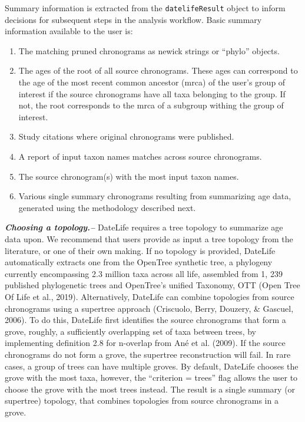 \documentclass[english,man]{apa6}
\providecommand{\tightlist}{%
  \setlength{\itemsep}{0pt}\setlength{\parskip}{0pt}}
\begin{document}
Summary information is extracted from the \texttt{datelifeResult} object to inform decisions for subsequent steps in the analysis workflow. Basic summary information available to the user is:

\begin{enumerate}
\def\labelenumi{\arabic{enumi}.}
\tightlist
\item
  The matching pruned chronograms as newick strings or \enquote{phylo} objects.
\item
  The ages of the root of all source chronograms. These ages can correspond to the age of the most recent common ancestor (mrca) of the user's group of interest if the source chronograms have all taxa belonging to the group. If not, the root corresponds to the mrca of a subgroup withing the group of interest.
\item
  Study citations where original chronograms were published.
\item
  A report of input taxon names matches across source chronograms.
\item
  The source chronogram(s) with the most input taxon names.
\item
  Various single summary chronograms resulting from summarizing age data, generated using the methodology described next.
\end{enumerate}

\emph{\textbf{Choosing a topology.--}}
DateLife requires a tree topology to summarize age data upon.
We recommend that users provide as input a tree topology from the literature, or one of their own making. If no topology is provided, DateLife automatically extracts one from the OpenTree synthetic tree, a phylogeny currently encompassing 2.3 million taxa across all life, assembled from 1, 239 published phylogenetic trees and OpenTree's unified Taxonomy, OTT (Open Tree Of Life et al., 2019).
Alternatively, DateLife can combine topologies from source chronograms using a supertree approach (Criscuolo, Berry, Douzery, \& Gascuel, 2006).
To do this, DateLife first identifies the source chronograms that form a grove, roughly, a sufficiently overlapping set of taxa between trees, by implementing definition 2.8 for n-overlap from Ané et al. (2009).
If the source chronograms do not form a grove, the supertree reconstruction will fail.
In rare cases, a group of trees can have multiple groves. By default, DateLife chooses the grove with the most taxa, however, the \enquote{criterion = trees} flag allows the user to choose the grove with the most trees instead.
The result is a single summary (or supertree) topology, that combines topologies from source chronograms in a grove.
\end{document}
